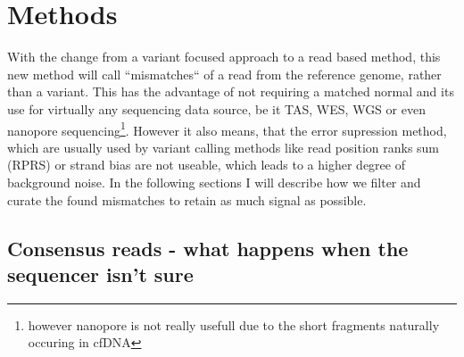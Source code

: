 \section{Methods}
\label{mmf-sec:methods}

With the change from a variant focused approach to a read based method, this new method will call ``mismatches`` of a read from the reference genome, rather than a variant. This has the advantage of not requiring a matched normal and its use for virtually any sequencing data source, be it TAS, WES, WGS or even nanopore sequencing\footnote{however nanopore is not really usefull due to the short fragments naturally occuring in cfDNA}. However it also means, that the error supression method, which are usually used by variant calling methods like read position ranks sum (RPRS) or strand bias are not useable, which leads to a higher degree of background noise. In the following sections I will describe how we filter and curate the found mismatches to retain as much signal as possible.

\subsection[Consensus reads]{Consensus reads - what happens when the sequencer isn't sure}
\label{mmf-sec:consensus}

